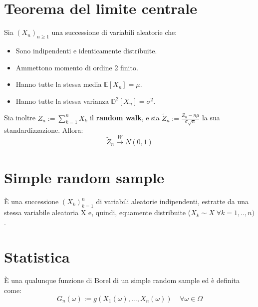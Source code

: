 \documentclass{article}
\begin{document}
\section*{Teorema del limite centrale}
Sia $(X_{n})_{n\geq 1}$ una successione di variabili aleatorie che:
\begin{itemize}
\item Sono indipendenti e identicamente distribuite.
\item Ammettono momento di ordine 2 finito.
\item Hanno tutte la stessa media $\mathbb{E}[X_{n}] = \mu$.
\item Hanno tutte la stessa varianza $\mathbb{D}^{2}[X_{n}] = \sigma^{2}$.
\end{itemize}
Sia inoltre $Z_{n} := \sum_{k=1}^{n}X_{k}$ il \textbf{random walk}, e sia $\widetilde{Z}_{n} := \frac{Z_{n}-n\mu}{\sigma \sqrt{n}}$ la sua standardizzazione. Allora:
\[ \widetilde{Z}_{n} \xrightarrow[]{W}N(0,1) \]

\section*{Simple random sample}
\`E una successione $(X_{k})_{k=1}^{n}$ di variabili aleatorie indipendenti, estratte da una stessa variabile aleatoria X e, quindi, equamente distribuite ($X_{k} \sim X \; \forall k = 1,..,n)$.

\section*{Statistica}
\`E una qualunque funzione di Borel di un simple random sample ed è definita come:
\[ G_{n}(\omega) := g(X_{1}(\omega),...,X_{n}(\omega)) \; \; \; \; \forall \omega \in \Omega \]
\end{document}
